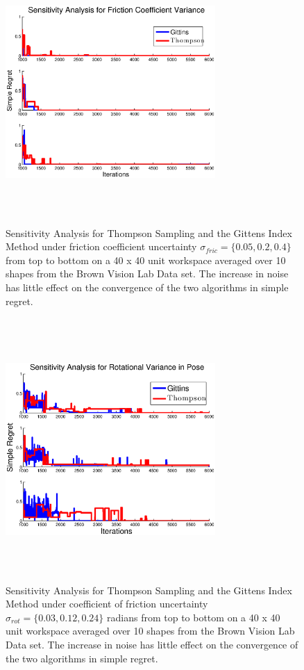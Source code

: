 \documentclass[journal,transmag]{IEEEtran}%
\begin{document}
\begin{figure}[ht!]
\centering
\includegraphics[width = 8cm, height = 10cm]{matlab_figures/sensitivity_fric.eps}
\caption{ \footnotesize Sensitivity Analysis for Thompson Sampling and the Gittens Index Method under friction coefficient uncertainty $\sigma_{fric} = \lbrace 0.05,0.2, 0.4 \rbrace$  from top to bottom on a 40 x 40 unit workspace averaged over 10 shapes from the Brown Vision Lab Data set. The increase in noise has little effect on the convergence of the two algorithms in simple regret.}
\vspace*{-10pt}
\label{fig:fric_sens}
\end{figure}

\begin{figure}[ht!]
\centering
\includegraphics[width = 8cm, height = 10cm]{matlab_figures/sensitivity_rot.eps}
\caption{ \footnotesize Sensitivity Analysis for Thompson Sampling and the Gittens Index Method under coefficient of friction uncertainty $\sigma_{rot} = \lbrace 0.03,0.12, 0.24 \rbrace$ radians from top to bottom on a 40 x 40 unit workspace averaged over 10 shapes from the Brown Vision Lab Data set. The increase in noise has little effect on the convergence of the two algorithms in simple regret. }
\vspace*{-10pt}
\label{fig:rot_sens}
\end{figure}
\end{document}

